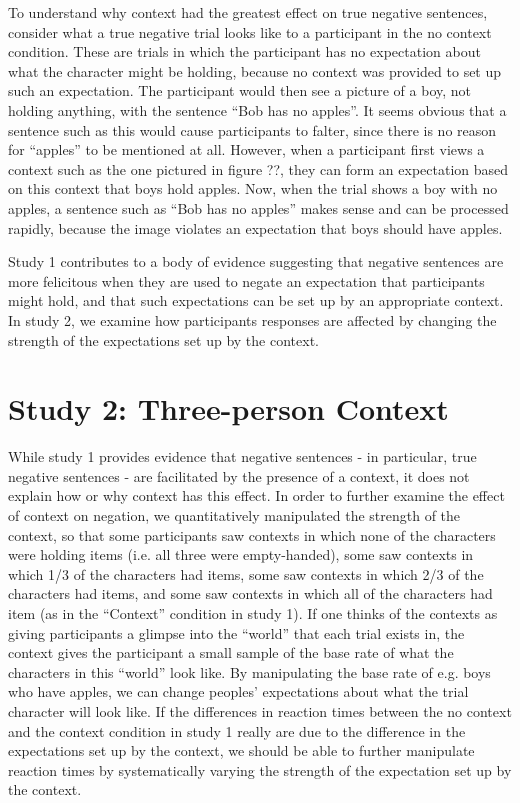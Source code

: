\documentclass[10pt,letterpaper]{article}
\begin{document}
To understand why context had the greatest effect on true negative sentences, consider what a true negative trial looks like to a participant in the no context condition.  These are trials in which the participant has no expectation about what the character might be holding, because no context was provided to set up such an expectation.  The participant would then see a picture of a boy, not holding anything, with the sentence ``Bob has no apples''.  It seems obvious that a sentence such as this would cause participants to falter, since there is no reason for ``apples'' to be mentioned at all.  However, when a participant first views a context such as the one pictured in figure ??, they can form an expectation based on this context that boys hold apples.  Now, when the trial shows a boy with no apples, a sentence such as ``Bob has no apples'' makes sense and can be processed rapidly, because the image violates an expectation that boys should have apples.  

Study 1 contributes to a body of evidence suggesting that negative sentences are more felicitous when they are used to negate an expectation that participants might hold, and that such expectations can be set up by an appropriate context.  In study 2, we examine how participants responses are affected by changing the strength of the expectations set up by the context.  

\section{Study 2: Three-person Context}
While study 1 provides evidence that negative sentences - in particular, true negative sentences - are facilitated by the presence of a context, it does not explain how or why context has this effect.  In order to further examine the effect of context on negation, we quantitatively manipulated the strength of the context, so that some participants saw contexts in which none of the characters were holding items (i.e. all three were empty-handed), some saw contexts in which 1/3 of the characters had items, some saw contexts in which 2/3 of the characters had items, and some saw contexts in which all of the characters had item (as in the ``Context'' condition in study 1).  If one thinks of the contexts as giving participants a glimpse into the ``world'' that each trial exists in, the context gives the participant a small sample of the base rate of what the characters in this ``world'' look like.  By manipulating the base rate of e.g. boys who have apples, we can change peoples' expectations about what the trial character will look like.  If the differences in reaction times between the no context and the context condition in study 1 really are due to the difference in the expectations set up by the context, we should be able to further manipulate reaction times by systematically varying the strength of the expectation set up by the context.  
\end{document}
